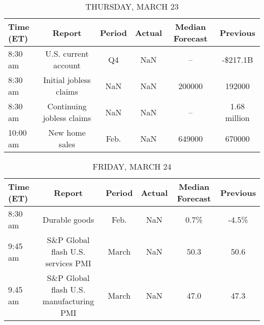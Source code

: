 \documentclass{article}%
\begin{document}
\begin{table}[htbp]%
\caption{THURSDAY, MARCH 23}%
\centering%
\begin{adjustbox}{width=1\textwidth}%
\begin{tabular}{lccccc}
\toprule
Time (ET) &                    Report & Period & Actual & Median Forecast &     Previous \\
\midrule
  8:30 am &      U.S. current account &     Q4 &    NaN &              -- &     -\$217.1B \\
  8:30 am &    Initial jobless claims &    NaN &    NaN &          200000 &       192000 \\
  8:30 am & Continuing jobless claims &    NaN &    NaN &              -- & 1.68 million \\
 10:00 am &            New home sales &   Feb. &    NaN &          649000 &       670000 \\
\bottomrule
\end{tabular}
%
\end{adjustbox}%
\end{table}

%


\begin{table}[htbp]%
\caption{FRIDAY, MARCH 24}%
\centering%
\begin{adjustbox}{width=1\textwidth}%
\begin{tabular}{lccccc}
\toprule
Time (ET) &                                  Report & Period & Actual & Median Forecast & Previous \\
\midrule
  8:30 am &                           Durable goods &   Feb. &    NaN &            0.7\% &    -4.5\% \\
  9:45 am &      S\&P Global flash U.S. services PMI &  March &    NaN &            50.3 &     50.6 \\
  9.45 am & S\&P Global flash U.S. manufacturing PMI &  March &    NaN &            47.0 &     47.3 \\
\bottomrule
\end{tabular}
%
\end{adjustbox}%
\end{table}
\end{document}
